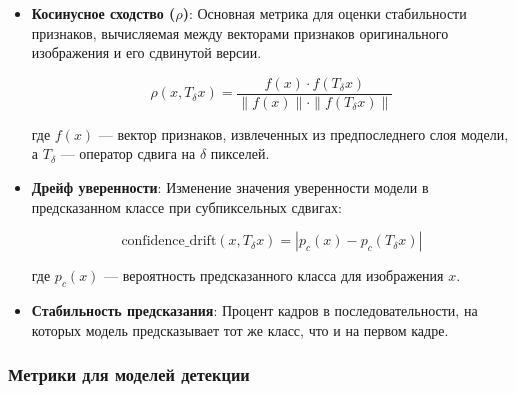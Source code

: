 \begin{itemize}
    \item \textbf{Косинусное сходство ($\rho$)}: Основная метрика для оценки стабильности признаков, вычисляемая между векторами признаков оригинального изображения и его сдвинутой версии.
    
    \begin{equation}
    \rho(x, T_{\delta}x) = \frac{f(x) \cdot f(T_{\delta}x)}{\|f(x)\| \cdot \|f(T_{\delta}x)\|}
    \end{equation}
    
    где $f(x)$ — вектор признаков, извлеченных из предпоследнего слоя модели, а $T_{\delta}$ — оператор сдвига на $\delta$ пикселей.
    
    \item \textbf{Дрейф уверенности}: Изменение значения уверенности модели в предсказанном классе при субпиксельных сдвигах:
    
    \begin{equation}
    \text{confidence\_drift}(x, T_{\delta}x) = |p_c(x) - p_c(T_{\delta}x)|
    \end{equation}
    
    где $p_c(x)$ — вероятность предсказанного класса для изображения $x$.
    
    \item \textbf{Стабильность предсказания}: Процент кадров в последовательности, на которых модель предсказывает тот же класс, что и на первом кадре.
\end{itemize}

\subsubsection{Метрики для моделей детекции}
\label{experiments:setup:metrics:detection}

